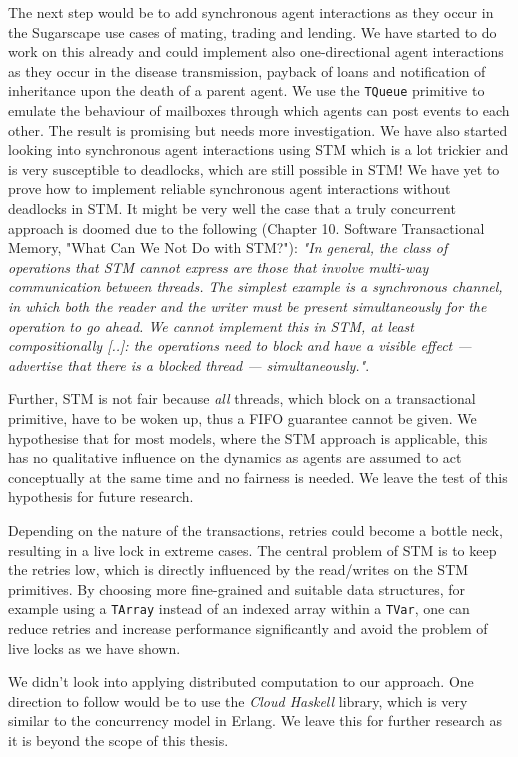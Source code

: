The next step would be to add synchronous agent interactions as they occur in the Sugarscape use cases of mating, trading and lending. We have started to do work on this already and could implement also one-directional agent interactions as they occur in the disease transmission, payback of loans and notification of inheritance upon the death of a parent agent. We use the \texttt{TQueue} primitive to emulate the behaviour of mailboxes through which agents can post events to each other. The result is promising but needs more investigation. We have also started looking into synchronous agent interactions using STM which is a lot trickier and is very susceptible to deadlocks, which are still possible in STM! We have yet to prove how to implement reliable synchronous agent interactions without deadlocks in STM. It might be very well the case that a truly concurrent approach is doomed due to the following \cite{marlow_parallel_2013} (Chapter 10. Software Transactional Memory, "What Can We Not Do with STM?"): \textit{"In general, the class of operations that STM cannot express are those that involve multi-way communication between threads. The simplest example is a synchronous channel, in which both the reader and the writer must be present simultaneously for the operation to go ahead. We cannot implement this in STM, at least compositionally [..]: the operations need to block and have a visible effect — advertise that there is a blocked thread — simultaneously."}. 

Further, STM is not fair because \textit{all} threads, which block on a transactional primitive, have to be woken up, thus a FIFO guarantee cannot be given. We hypothesise that for most models, where the STM approach is applicable, this has no qualitative influence on the dynamics as agents are assumed to act conceptually at the same time and no fairness is needed. We leave the test of this hypothesis for future research.

Depending on the nature of the transactions, retries could become a bottle neck, resulting in a live lock in extreme cases. The central problem of STM is to keep the retries low, which is directly influenced by the read/writes on the STM primitives. By choosing more fine-grained and suitable data structures, for example using a \texttt{TArray} instead of an indexed array within a \texttt{TVar}, one can reduce retries and increase performance significantly and avoid the problem of live locks as we have shown.

We didn't look into applying distributed computation to our approach. One direction to follow would be to use the \textit{Cloud Haskell} library, which is very similar to the concurrency model in Erlang. We leave this for further research as it is beyond the scope of this thesis.

